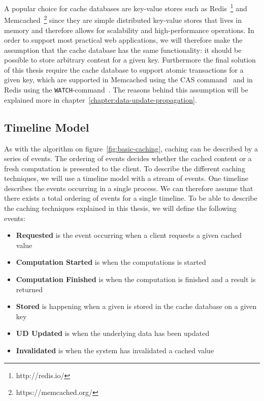 A popular choice for cache databases are key-value stores such as Redis~\footnote{http://redis.io/} and Memcached~\footnote{https://memcached.org/} since they are simple distributed key-value stores that lives in memory and therefore allows for scalability and high-performance operations. In order to support most practical web applications, we will therefore make the assumption that the cache database has the same functionality: it should be possible to store arbitrary content for a given key. Furthermore the final solution of this thesis require the cache database to support atomic transactions for a given key, which are supported in Memcached using the CAS command~\cite{docs:memcached-protocol} and in Redis using the \verb$WATCH$-command~\cite{docs:redis-transactions}. The reasons behind this assumption will be explained more in chapter~\ref{chapter:data-update-propagation}.



\subsection{Timeline Model}
\label{subsec:timeline_model}

As with the algorithm on figure~\ref{fig:basic-caching}, caching can be described by a series of events. The ordering of events decides whether the cached content or a fresh computation is presented to the client. To describe the different caching techniques, we will use a timeline model with a stream of events. One timeline describes the events occurring in a single process. We can therefore assume that there exists a total ordering of events for a single timeline. To be able to describe the caching techniques explained in this thesis, we will define the following events:

\begin{itemize}
  \item \textbf{Requested} is the event occurring when a client requests a given cached value
  \item \textbf{Computation Started} is when the computations is started
  \item \textbf{Computation Finished} is when the computation is finished and a result is returned
  \item \textbf{Stored} is happening when a given is stored in the cache database on a given key
  \item \textbf{UD Updated} is when the underlying data has been updated
  \item \textbf{Invalidated} is when the system has invalidated a cached value
\end{itemize}

